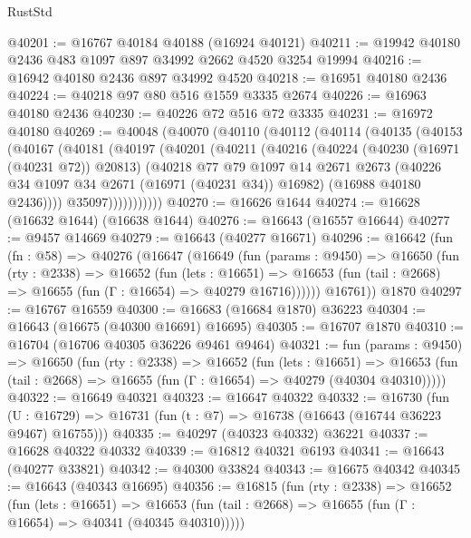 \begin{lexlean}{RustStd}
\begin{coremodule}
@40201 := @16767 @40184 @40188 (@16924 @40121)
@40211 := @19942 @40180 @2436 @483 @1097 @897 @34992 @2662 @4520 @3254 @19994
@40216 := @16942 @40180 @2436 @897 @34992 @4520
@40218 := @16951 @40180 @2436
@40224 := @40218 @97 @80 @516 @1559 @3335 @2674
@40226 := @16963 @40180 @2436
@40230 := @40226 @72 @516 @72 @3335
@40231 := @16972 @40180
@40269 := @40048
    (@40070
      (@40110
        (@40112
          (@40114
            (@40135
              (@40153
                (@40167
                  (@40181
                    (@40197
                      (@40201
                        (@40211
                          (@40216
                            (@40224
                              (@40230 (@16971 (@40231 @72)) @20813)
                              (@40218
                                @77
                                @79
                                @1097
                                @14
                                @2671
                                @2673
                                (@40226 @34 @1097 @34 @2671 (@16971 (@40231 @34)) @16982)
                                (@16988 @40180 @2436))))
                          @35097)))))))))))
@40270 := @16626 @1644
@40274 := @16628 (@16632 @1644) (@16638 @1644)
@40276 := @16643 (@16557 @16644)
@40277 := @9457 @14669
@40279 := @16643 (@40277 @16671)
@40296 := @16642
    (fun (fn : @58) =>
    @40276
      (@16647
        (@16649
          (fun (params : @9450) =>
          @16650
            (fun (rty : @2338) =>
            @16652
              (fun (lets : @16651) =>
              @16653 (fun (tail : @2668) => @16655 (fun (Γ : @16654) => @40279 @16716))))))
        @16761))
    @1870
@40297 := @16767 @16559
@40300 := @16683 (@16684 @1870) @36223
@40304 := @16643 (@16675 (@40300 @16691) @16695)
@40305 := @16707 @1870
@40310 := @16704 (@16706 @40305 @36226 @9461 @9464)
@40321 := fun (params : @9450) =>
  @16650
    (fun (rty : @2338) =>
    @16652
      (fun (lets : @16651) =>
      @16653 (fun (tail : @2668) => @16655 (fun (Γ : @16654) => @40279 (@40304 @40310)))))
@40322 := @16649 @40321
@40323 := @16647 @40322
@40332 := @16730
    (fun (U : @16729) => @16731 (fun (t : @7) => @16738 (@16643 (@16744 @36223 @9467) @16755)))
@40335 := @40297 (@40323 @40332) @36221
@40337 := @16628 @40322 @40332
@40339 := @16812 @40321 @6193
@40341 := @16643 (@40277 @33821)
@40342 := @40300 @33824
@40343 := @16675 @40342
@40345 := @16643 (@40343 @16695)
@40356 := @16815
    (fun (rty : @2338) =>
    @16652
      (fun (lets : @16651) =>
      @16653 (fun (tail : @2668) => @16655 (fun (Γ : @16654) => @40341 (@40345 @40310)))))

\end{coremodule}
\end{lexlean}
